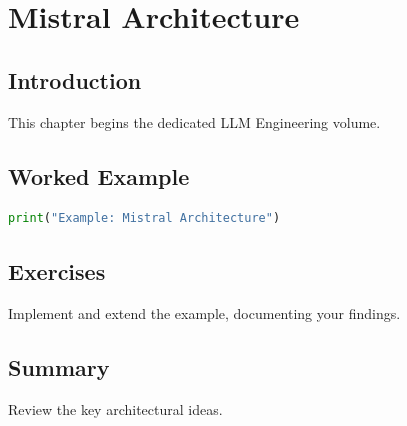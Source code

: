 \chapter{Mistral Architecture}
\label{chap:vol9-4}



\section{Introduction}
This chapter begins the dedicated LLM Engineering volume.

\section{Worked Example}
\begin{lstlisting}[language=Python]
print("Example: Mistral Architecture")
\end{lstlisting}

\section{Exercises}
\begin{exercise}
Implement and extend the example, documenting your findings.
\end{exercise}

\section{Summary}
Review the key architectural ideas.
